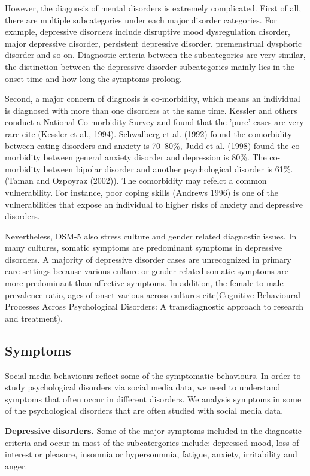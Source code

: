 However, the diagnosis of mental disorders is extremely complicated. First of all, there are multiple subcategories under each major disorder categories. For example, depressive disorders include disruptive mood dysregulation disorder, major depressive disorder, persistent depressive disorder, premenstrual dysphoric disorder and so on. Diagnostic criteria between the subcategories are very similar, the distinction between the depressive disorder subcategories mainly lies in the onset time and how long the symptoms prolong. 

Second, a major concern of diagnosis is co-morbidity, which means an individual is diagnosed with more than one disorders at the same time. Kessler and others conduct a National Co-morbidity Survey and found that the 'pure' cases are very rare cite (Kessler et al., 1994). Schwalberg et al. (1992) found the comorbidity between eating disorders and anxiety is 70–80\%, Judd et al. (1998) found the co-morbidity between general anxiety disorder and depression is 80\%. The co-morbidity between bipolar disorder and another psychological disorder is 61\%. (Taman and Ozpoyraz (2002)). The comorbidity may refelct a common vulnerability. For instance, poor coping skills  (Andrews 1996) is one of the vulnerabilities that expose an individual to higher risks of anxiety and depressive disorders. 

Nevertheless, DSM-5 also stress culture and gender related diagnostic issues. In many cultures, somatic symptoms are predominant symptoms in depressive disorders. A majority of depressive disorder cases are unrecognized in primary care settings because various culture or gender related somatic symptoms are more predominant than affective symptoms. In addition, the female-to-male prevalence ratio, ages of onset various across cultures cite(Cognitive Behavioural Processes Across Psychological Disorders: A transdiagnostic approach to research and treatment). 

\subsection{Symptoms}

Social media behaviours reflect some of the symptomatic behaviours. In order to study psychological disorders via social media data, we need to understand symptoms that often occur in different disorders. We analysis symptoms in some of the psychological disorders that are often studied with social media data.

\textbf{Depressive disorders.} Some of the major symptoms included in the diagnostic criteria and occur in most of the subcatergories include: depressed mood, loss of interest or pleasure, insomnia or hypersonmnia, fatigue, anxiety, irritability and anger.


